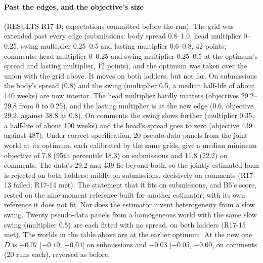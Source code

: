 \documentclass[10pt]{article}
\begin{document}
\paragraph{Past the edges, and the objective's size} (RESULTS R17-D; expectations committed before the run). The grid was extended past every edge (submissions: body spread 0.8--1.0, head multiplier 0--0.25, swing multiplier 0.25--0.5 and lasting multiplier 0.6--0.8, 42 points; comments: head multiplier 0--0.25 and swing multiplier 0.25--0.5 at the optimum's spread and lasting multiplier, 12 points), and the optimum was taken over the union with the grid above. It moves on both ladders, but not far. On submissions the body's spread (0.8) and the swing (multiplier 0.5, a median half-life of about 140 weeks) are now interior. The head multiplier hardly matters (objectives 29.2--29.8 from 0 to 0.25), and the lasting multiplier is at the new edge (0.6, objective 29.2, against 38.8 at 0.8). On comments the swing slows further (multiplier 0.35, a half-life of about 100 weeks) and the head's spread goes to zero (objective 439 against 487). Under correct specification, 20 pseudo-data panels from the joint world at its optimum, each calibrated by the same grids, give a median minimum objective of 7.8 (95th percentile 18.3) on submissions and 11.8 (22.2) on comments. The data's 29.2 and 439 lie beyond both, so the jointly estimated form is rejected on both ladders: mildly on submissions, decisively on comments (R17-13 failed; R17-14 met). The statement that it fits on submissions, and B5's score, rested on the nine-moment reference built for another estimator; with its own reference it does not fit. Nor does the estimator invent heterogeneity from a slow swing. Twenty pseudo-data panels from a homogeneous world with the same slow swing (multiplier 0.5) are each fitted with no spread, on both ladders (R17-15 met). The worlds in the table above are at the earlier optimum. At the new one $D$ is $-0.07$ [$-0.10$, $-0.04$] on submissions and $-0.03$ [$-0.05$, $-0.00$] on comments (20 runs each), reversed as before.
\end{document}
